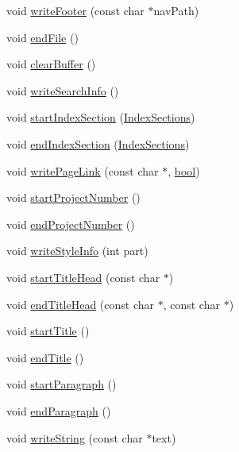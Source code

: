 \begin{DoxyCompactItemize}
\item 
void \hyperlink{class_html_generator_a53e64fb26be1bf0e61e5f8d6fe1f1509}{write\+Footer} (const char $\ast$nav\+Path)
\item 
void \hyperlink{class_html_generator_aecd9da9f7e9201df51cfe46ab71c6e30}{end\+File} ()
\item 
void \hyperlink{class_html_generator_af0be36300dc3636e212df095e2b31397}{clear\+Buffer} ()
\item 
void \hyperlink{class_html_generator_aa60e46a4d67ca28c8676a97ad0968069}{write\+Search\+Info} ()
\item 
void \hyperlink{class_html_generator_a686b599d09c8254a8d28589aa18e2ca1}{start\+Index\+Section} (\hyperlink{index_8h_aec03800047ada46460eb75113cfee322}{Index\+Sections})
\item 
void \hyperlink{class_html_generator_a4f525285e864992a9e9004293c6dcf72}{end\+Index\+Section} (\hyperlink{index_8h_aec03800047ada46460eb75113cfee322}{Index\+Sections})
\item 
void \hyperlink{class_html_generator_a17175f9f54dbfcc611c728ef0efdcfb3}{write\+Page\+Link} (const char $\ast$, \hyperlink{qglobal_8h_a1062901a7428fdd9c7f180f5e01ea056}{bool})
\item 
void \hyperlink{class_html_generator_a68e4cfb8ef2701dd7a6d6bceeda1e55a}{start\+Project\+Number} ()
\item 
void \hyperlink{class_html_generator_a56bb1fc7587fe00fbe3fb3cf6c9973ac}{end\+Project\+Number} ()
\item 
void \hyperlink{class_html_generator_a67494e4d92c2b6f4bf19a51ab9417659}{write\+Style\+Info} (int part)
\item 
void \hyperlink{class_html_generator_aa2d4c7b39f08d95acd0b73d0ba7a2c64}{start\+Title\+Head} (const char $\ast$)
\item 
void \hyperlink{class_html_generator_a44202d0de92814df8521f373adc257d9}{end\+Title\+Head} (const char $\ast$, const char $\ast$)
\item 
void \hyperlink{class_html_generator_a0fd5a2e848ea16b025b1fb07b4b307fc}{start\+Title} ()
\item 
void \hyperlink{class_html_generator_ae1337adbb5ad6cea03fcee0d5a7cdfce}{end\+Title} ()
\item 
void \hyperlink{class_html_generator_a471c8c0a88245c500c5cc88bd64efa11}{start\+Paragraph} ()
\item 
void \hyperlink{class_html_generator_a48e5516f348a9ec6ed456a6a3b003af3}{end\+Paragraph} ()
\item 
void \hyperlink{class_html_generator_ad54dd4f0dda0e22574149cfb4415ae4a}{write\+String} (const char $\ast$text)

\end{DoxyCompactItemize}

